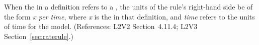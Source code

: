 When the  in a \RateRule definition refers to a \Parameter,
the units of the rule's right-hand side  be of the form \emph{x per
time}, where \emph{x} is the  in that \Parameter definition,
and \emph{time} refers to the units of time for the model.  (References:
L2V2 Section~4.11.4; L2V3 Section~\ref{sec:raterule}.)
